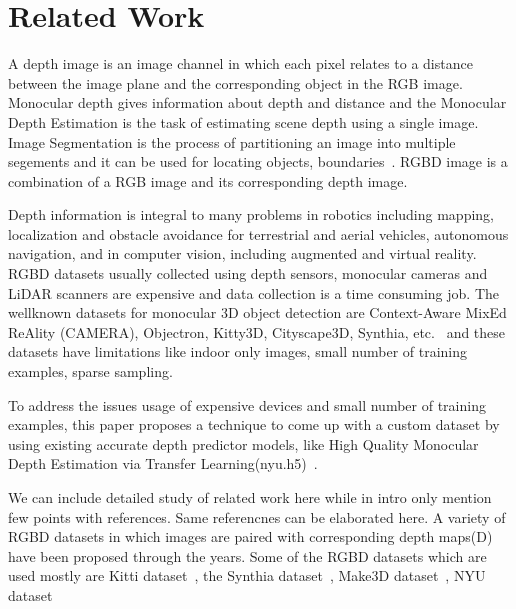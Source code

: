 \documentclass[review]{cvpr}
\begin{document}
\section {Related Work}

A depth image is an image channel in which each pixel relates to a distance between the image plane and the
corresponding object in the RGB image.
Monocular depth gives information about depth and distance and the Monocular Depth Estimation is the task of estimating scene depth 
using a single image\cite{abuolaim2020defocus}. 
Image Segmentation is the process of partitioning an image into multiple segements and it can be used for locating objects, 
boundaries~\cite{amza2012review}. RGBD image is a combination of a RGB image and its corresponding depth image\cite{zhang2018deep}.
 
Depth information is integral to many problems in
robotics including mapping, localization and obstacle avoidance for terrestrial and aerial vehicles, autonomous navigation, 
and in computer vision, including augmented and virtual reality\cite{marchand2015pose}. RGBD datasets usually collected 
using depth sensors, monocular cameras and LiDAR scanners are expensive and data collection is a time consuming job. 
The wellknown datasets for monocular 3D object detection are Context-Aware MixEd ReAlity (CAMERA), Objectron, 
Kitty3D, Cityscape3D, Synthia, etc.~\cite{} and these datasets have 
 limitations like indoor only images, small number of training examples, sparse sampling. 
 
 To address the issues usage of 
 expensive devices and small number of training examples, this paper proposes a technique to come up with a custom dataset 
 by using existing accurate depth predictor models, like High Quality Monocular Depth Estimation 
 via Transfer Learning(nyu.h5)~\cite{alhashim2018high}. 
 



We can include detailed study of related work here while in intro only mention few points with references. Same referencnes can be elaborated here. 
A variety of RGBD datasets in which images are paired with corresponding depth maps(D) have been proposed through the years.
Some of the RGBD datasets which are used mostly are Kitti dataset~\cite{geiger2013vision}, the Synthia dataset~\cite{ros2016synthia}, 
Make3D dataset~\cite{saxena2008make3d}, NYU dataset~\cite{silberman2012indoor}
\end{document}
